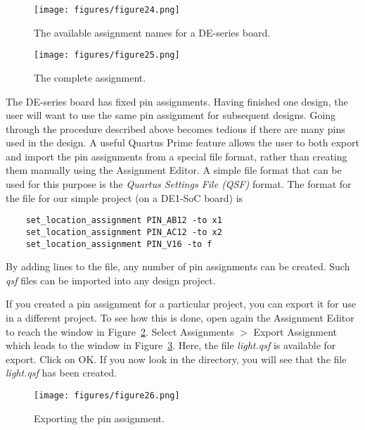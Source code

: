 \begin{figure}[H]
   \begin{center}
      \texttt{[image: figures/figure24.png]}
   \caption{The available assignment names for a DE-series board.} 
	 \label{fig:24}
	 \end{center}
\end{figure}


\begin{figure}[H]
   \begin{center}
      \texttt{[image: figures/figure25.png]}
   \caption{The complete assignment.} 
	 \label{fig:25}
	 \end{center}
\end{figure}

The DE-series board has fixed pin assignments. Having finished one design, the user will want
to use the same pin assignment for subsequent designs. Going through the procedure 
described above becomes tedious if there are many pins used in the design.
A useful Quartus Prime feature allows the user to both
export and import the pin assignments from a special file format, 
rather than creating them manually
using the Assignment Editor. A simple file format that can be used for this purpose
is the {\it Quartus Settings File (QSF)} format. The format for the file for our simple project (on a DE1-SoC board) is

\begin{center}
\begin{verbatim}
	set_location_assignment PIN_AB12 -to x1
	set_location_assignment PIN_AC12 -to x2
	set_location_assignment PIN_V16 -to f
\end{verbatim}
\end{center}

\noindent
By adding lines to the file, any number of pin assignments can be created.
Such {\it qsf} files can be imported into any design project.

If you created a pin assignment for a particular project, you can export it
for use in a different project. To see how this is done, open again the Assignment Editor
to reach the window in Figure~\ref{fig:25}. Select {\sf Assignments $>$ Export Assignment} which leads to the
window in Figure~\ref{fig:26}. Here, the file {\it light.qsf} is available for export.
Click on {\sf OK}.
If you now look in the directory, you will see that
the file {\it light.qsf} has been created.
 
\begin{figure}[H]
   \begin{center}
      \texttt{[image: figures/figure26.png]}
   \caption{Exporting the pin assignment.} 
	 \label{fig:26}
	 \end{center}
\end{figure}

